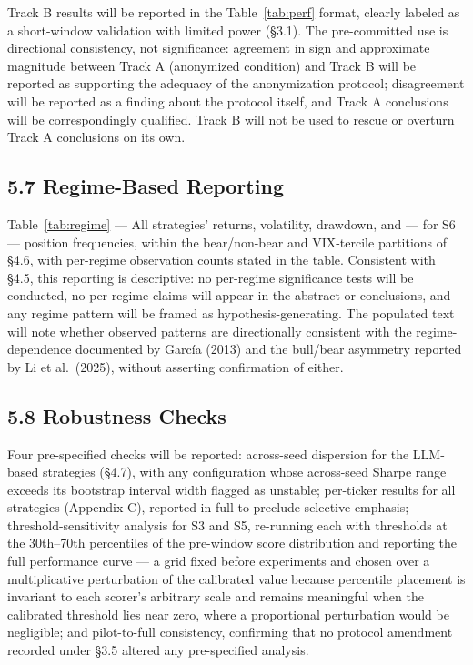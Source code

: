 \documentclass[
  12pt,
]{article}
\begin{document}
Track B results will be reported in the Table~\ref{tab:perf} format, clearly labeled
as a short-window validation with limited power (§3.1). The
pre-committed use is directional consistency, not significance:
agreement in sign and approximate magnitude between Track A (anonymized
condition) and Track B will be reported as supporting the adequacy of
the anonymization protocol; disagreement will be reported as a finding
about the protocol itself, and Track A conclusions will be
correspondingly qualified. Track B will not be used to rescue or
overturn Track A conclusions on its own.

\hypertarget{regime-based-reporting}{%
\subsection{5.7 Regime-Based Reporting}\label{regime-based-reporting}}



\begin{table}[H]
\centering
{}
\caption{Per-regime descriptive performance with observation counts (placeholder; to be populated after experiments).}
\label{tab:regime}
\end{table}

Table~\ref{tab:regime} — All strategies' returns, volatility, drawdown, and
--- for S6 --- position frequencies, within the bear/non-bear and
VIX-tercile partitions of §4.6, with per-regime observation counts
stated in the table. Consistent with §4.5, this reporting is
descriptive: no per-regime significance tests will be conducted, no
per-regime claims will appear in the abstract or conclusions, and any
regime pattern will be framed as hypothesis-generating. The populated
text will note whether observed patterns are directionally consistent
with the regime-dependence documented by García (2013) and the bull/bear
asymmetry reported by Li et al.~(2025), without asserting confirmation
of either.

\hypertarget{robustness-checks}{%
\subsection{5.8 Robustness Checks}\label{robustness-checks}}

Four pre-specified checks will be reported: across-seed dispersion for
the LLM-based strategies (§4.7), with any configuration whose
across-seed Sharpe range exceeds its bootstrap interval width flagged as
unstable; per-ticker results for all strategies (Appendix C), reported
in full to preclude selective emphasis; threshold-sensitivity analysis
for S3 and S5, re-running each with thresholds at the 30th--70th
percentiles of the pre-window score distribution and reporting the full
performance curve --- a grid fixed before experiments and chosen over a
multiplicative perturbation of the calibrated value because percentile
placement is invariant to each scorer's arbitrary scale and remains
meaningful when the calibrated threshold lies near zero, where a
proportional perturbation would be negligible; and pilot-to-full
consistency, confirming that no protocol amendment recorded under §3.5
altered any pre-specified analysis.
\end{document}
